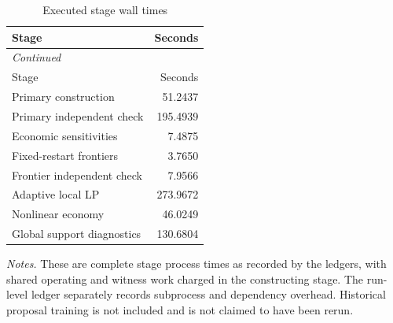 {\small\setlength{\tabcolsep}{4pt}\begin{longtable}{lr}
\caption{Executed stage wall times}\label{tab:all_work}\\
\toprule
Stage & Seconds \\
\midrule\endfirsthead
\multicolumn{2}{l}{\emph{Continued}}\\\toprule
Stage & Seconds \\
\midrule\endhead
Primary construction & 51.2437 \\
Primary independent check & 195.4939 \\
Economic sensitivities & 7.4875 \\
Fixed-restart frontiers & 3.7650 \\
Frontier independent check & 7.9566 \\
Adaptive local LP & 273.9672 \\
Nonlinear economy & 46.0249 \\
Global support diagnostics & 130.6804 \\
\bottomrule\end{longtable}}
\noindent\emph{Notes.} These are complete stage process times as recorded by the ledgers, with shared operating and witness work charged in the constructing stage. The run-level ledger separately records subprocess and dependency overhead. Historical proposal training is not included and is not claimed to have been rerun.

